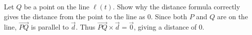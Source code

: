 {Let $Q$ be a point on the line $\ell(t)$. Show why the distance formula correctly gives the distance from the point to the line as $0$.
}
{Since both $P$ and $Q$ are on the line, $\overrightarrow{PQ}$ is parallel to $\vec d$. Thus $\overrightarrow{PQ}\times \vec d = \vec 0$, giving a distance of $0$.
}

